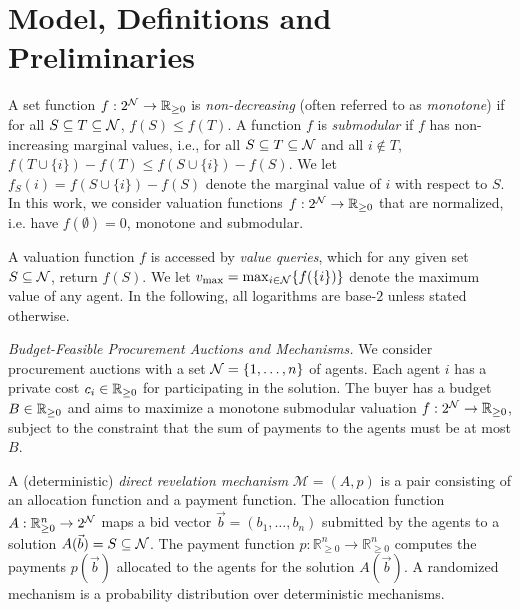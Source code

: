 \section{Model, Definitions and Preliminaries}
\label{sec:prelim}

%
A set function $f : 2^{\mathcal{N}} \to \mathbb{R}_{\geq 0}$ is \emph{non-decreasing} (often referred to as \emph{monotone}) if for all $S \subseteq T \subseteq \mathcal{N}$, $f(S) \leq f(T)$. A function $f$ is \emph{submodular} if $f$ has non-increasing marginal values, i.e., for all $S \subseteq T \subseteq \mathcal{N}$ and all $i \not\in T$, $f(T \cup \{i\}) - f(T) \leq f(S \cup \{i\}) - f(S)$. We let $f_S(i) = f(S \cup \{ i \}) - f(S)$ denote the marginal value of $i$ with respect to $S$. In this work, we consider valuation functions $f : 2^{\mathcal{N}} \to \mathbb{R}_{\geq 0}$ that are normalized, i.e. have $f(\emptyset) = 0$, monotone and submodular. 

A valuation function $f$ is accessed by \emph{value queries}, which for any given set $S \subseteq \mathcal{N}$, return $f(S)$. We let $v_{\text{max}} = \max_{i \in \mathcal{N}} \{ f(\{ i \})\}$ denote the maximum value of any agent. In the following, all logarithms are base-$2$ unless stated otherwise. 

\vskip2pt\textit{Budget-Feasible Procurement Auctions and Mechanisms.}
%
We consider procurement auctions with a set $\mathcal{N} = \{1, \ldots, n\}$ of agents. Each agent $i$ has a private cost $c_i \in \mathbb{R}_{\geq 0}$ for participating in the solution. The buyer has a budget $B \in \mathbb{R}_{\geq 0}$ and aims to maximize a monotone submodular valuation $f : 2^{\mathcal{N}} \to \mathbb{R}_{\geq 0}$, subject to the constraint that the sum of payments to the agents must be at most $B$. 

A (deterministic) \emph{direct revelation mechanism} $\mathcal{M} = (A, p)$ is a pair consisting of an allocation function and a payment function. The allocation function $A: \mathbb{R}_{\geq 0}^{n} \to 2^{\mathcal{N}}$ maps a bid vector $\vec{b} = (b_1, \ldots, b_n)$ submitted by the agents to a solution $A(\vec{b}) = S \subseteq \mathcal{N}$. The payment function $p: \mathbb{R}_{\geq 0}^{n} \to \mathbb{R}_{\geq 0}^{n}$ computes the payments $p(\vec{b})$ allocated to the agents for the solution $A(\vec{b})$. A randomized mechanism is a probability distribution over deterministic mechanisms. 

